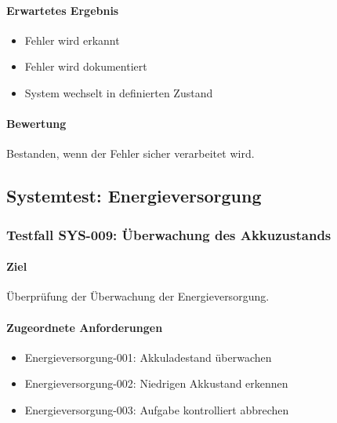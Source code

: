 \documentclass[
  a4paper,
  12pt,
  DIV=12,        %
  parskip=half,  %
  headings=small %
]{scrartcl}
\theoremstyle{definition}
\providecommand{\tightlist}{%
  \setlength{\itemsep}{0pt}\setlength{\parskip}{0pt}}
\theoremstyle{definition}
\begin{document}
\paragraph{Erwartetes Ergebnis}\label{erwartetes-ergebnis-31}

\begin{itemize}
\tightlist
\item
  Fehler wird erkannt
\item
  Fehler wird dokumentiert
\item
  System wechselt in definierten Zustand
\end{itemize}

\paragraph{Bewertung}\label{bewertung-31}

Bestanden, wenn der Fehler sicher verarbeitet wird.

\subsection{Systemtest:
Energieversorgung}\label{systemtest-energieversorgung}

\subsubsection{Testfall SYS-009: Überwachung des
Akkuzustands}\label{testfall-sys-009-uxfcberwachung-des-akkuzustands}

\paragraph{Ziel}\label{ziel-32}

Überprüfung der Überwachung der Energieversorgung.

\paragraph{Zugeordnete
Anforderungen}\label{zugeordnete-anforderungen-32}

\begin{itemize}
\tightlist
\item
  Energieversorgung-001: Akkuladestand überwachen
\item
  Energieversorgung-002: Niedrigen Akkustand erkennen
\item
  Energieversorgung-003: Aufgabe kontrolliert abbrechen
\end{itemize}
\end{document}
